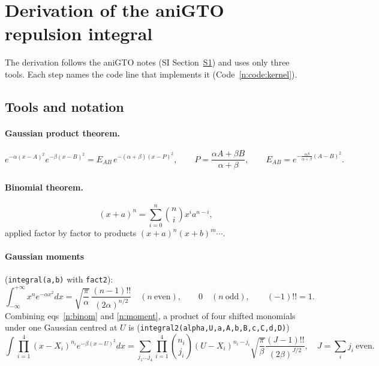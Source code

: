 \documentclass[11pt]{article}
\begin{document}
\section{Derivation of the aniGTO repulsion integral}
\label{n:sec:anigto}
The derivation follows the aniGTO notes (SI Section~\href{si.pdf\#section.1}{S1}) and uses only three
tools.  Each step names the code line that implements it (Code~\ref{n:code:kernel}).

\subsection{Tools and notation}
\paragraph{Gaussian product theorem.}
\begin{equation}
e^{-\alpha(x-A)^2}e^{-\beta(x-B)^2}=E_{AB}\,e^{-(\alpha+\beta)(x-P)^2},\qquad
P=\frac{\alpha A+\beta B}{\alpha+\beta},\qquad E_{AB}=e^{-\frac{\alpha\beta}{\alpha+\beta}(A-B)^2}.
\label{n:gpt}
\end{equation}
\paragraph{Binomial theorem.}
\begin{equation}
(x+a)^n=\sum_{i=0}^{n}\binom{n}{i}x^ia^{n-i},
\label{n:binom}
\end{equation}
applied factor by factor to products $(x+a)^n(x+b)^m\cdots$.
\paragraph{Gaussian moments} (\texttt{integral(a,b)} with \texttt{fact2}):
\begin{equation}
\int_{-\infty}^{+\infty}x^ne^{-\alpha x^2}dx=\sqrt{\frac{\pi}{\alpha}}\,\frac{(n-1)!!}{(2\alpha)^{n/2}}
\quad(n\ \text{even}),\qquad 0\quad(n\ \text{odd}),\qquad(-1)!!=1 .
\label{n:moment}
\end{equation}
Combining eqs~\ref{n:binom} and \ref{n:moment}, a product of four shifted monomials under one Gaussian
centred at $U$ is (\texttt{integral2(alpha,U,a,A,b,B,c,C,d,D)})
\begin{equation}
\int\prod_{i=1}^{4}(x-X_i)^{n_i}e^{-\beta(x-U)^2}dx
=\sum_{j_1\ldots j_4}\prod_{i=1}^4\binom{n_i}{j_i}(U-X_i)^{n_i-j_i}
\sqrt{\frac{\pi}{\beta}}\frac{(J-1)!!}{(2\beta)^{J/2}},\quad J=\textstyle\sum_ij_i\ \text{even}.
\label{n:int2}
\end{equation}
\end{document}
